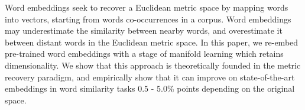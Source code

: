 Word embeddings seek to recover a Euclidean metric space by mapping words into vectors, starting from words co-occurrences in a corpus. Word embeddings may underestimate the similarity between nearby words, and overestimate it between distant words in the Euclidean metric space. In this paper, we re-embed pre-trained word embeddings with a stage of manifold learning which retains dimensionality. We show that this approach is theoretically founded in the metric recovery paradigm, and empirically show that it can improve on state-of-the-art embeddings in word similarity tasks 0.5 - 5.0\% points depending on the original space.
